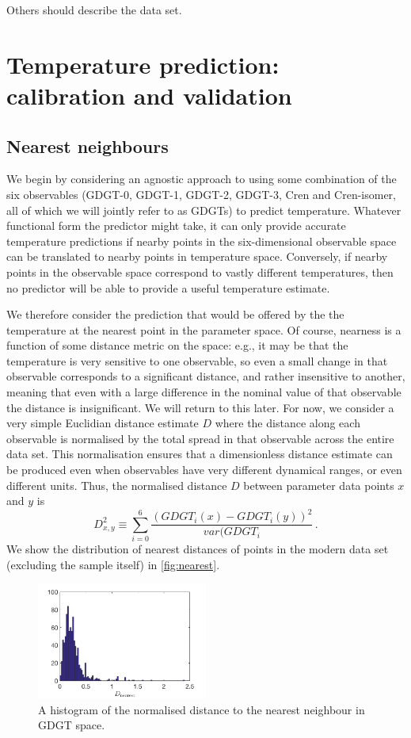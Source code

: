 \documentclass[rmp,aps,twocolumn]{revtex4-1}
\def\be{\begin{equation}}
\def\ee{\end{equation}}
\begin{document}
Others should describe the data set.

\section{Temperature prediction: calibration and validation}

\subsection{Nearest neighbours}

We begin by considering an agnostic approach to using some combination of the six observables (GDGT-0, GDGT-1, GDGT-2, GDGT-3, Cren and Cren-isomer, all of which we will jointly refer to as GDGTs) to predict temperature.  Whatever functional form the predictor might take, it can only provide accurate temperature predictions if nearby points in the six-dimensional observable space can be translated to nearby points in temperature space.  Conversely, if nearby points in the observable space correspond to vastly different temperatures, then no predictor will be able to provide a useful temperature estimate.

We therefore consider the prediction that would be offered by the the temperature at the nearest point in the parameter space.  Of course, nearness is a function of some distance metric on the space: e.g., it may be that the temperature is very sensitive to one observable, so even a small change in that observable corresponds to a significant distance, and rather insensitive to another, meaning that even with a large difference in the nominal value of that observable the distance is insignificant.  We will return to this later.  For now, we consider a very simple Euclidian distance estimate $D$ where the distance along each observable is normalised by the total spread in that observable across the entire data set.  This normalisation ensures that a dimensionless distance estimate can be produced even when observables have very different dynamical ranges, or even different units.  Thus, the normalised distance $D$ between parameter data points $x$ and $y$ is
\be\label{eq:dist}
D_{x,y}^2 \equiv \sum_{i=0}^{6} \frac{(GDGT_{i} (x) - GDGT_{i} (y) )^2}{var(GDGT_{i}} \, .
\ee
We show the distribution of nearest distances of points in the modern data set (excluding the sample itself) in \autoref{fig:nearest}.  

\begin{figure}
	\centering
	\includegraphics[width=0.5\textwidth]{nearest.png}
	\caption{\label{fig:nearest}  A histogram of the normalised distance to the nearest neighbour in GDGT space.}
\end{figure}
\end{document}
